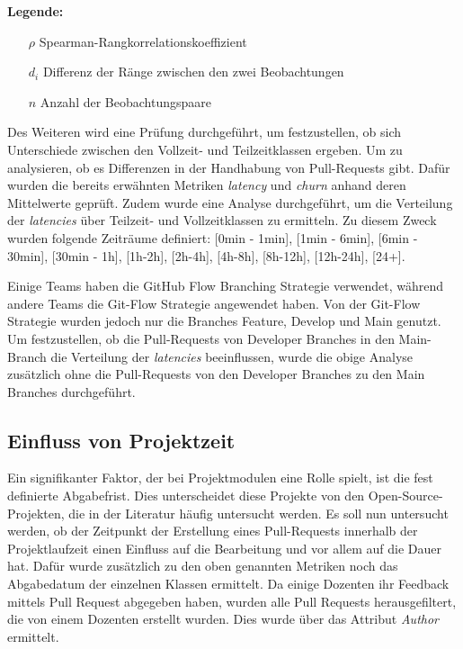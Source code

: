 \noindent\textbf{Legende:}
\begin{itemize}
  \item[$\rho$] Spearman-Rangkorrelationskoeffizient
  \item[$d_i$] Differenz der Ränge zwischen den zwei Beobachtungen 
  \item[$n$] Anzahl der Beobachtungspaare
\end{itemize}

Des Weiteren wird eine Prüfung durchgeführt, um festzustellen, ob sich Unterschiede zwischen den Vollzeit- und Teilzeitklassen ergeben. Um zu analysieren, ob es Differenzen in der Handhabung von Pull-Requests gibt. Dafür wurden die bereits erwähnten Metriken \textit{latency} und \textit{churn} anhand deren Mittelwerte geprüft. Zudem wurde eine Analyse durchgeführt, um die Verteilung der \textit{latencies} über Teilzeit- und Vollzeitklassen zu ermitteln. Zu diesem Zweck wurden folgende Zeiträume definiert: [0min - 1min], [1min - 6min], [6min - 30min], [30min - 1h], [1h-2h], [2h-4h], [4h-8h], [8h-12h], [12h-24h], [24+].

Einige Teams haben die GitHub Flow Branching Strategie verwendet, während andere Teams die Git-Flow Strategie angewendet haben. Von der Git-Flow Strategie wurden jedoch nur die Branches Feature, Develop und Main genutzt. Um festzustellen, ob die Pull-Requests von Developer Branches in den Main-Branch die Verteilung der \textit{latencies} beeinflussen, wurde die obige Analyse zusätzlich ohne die Pull-Requests von den Developer Branches zu den Main Branches durchgeführt.

\subsection{Einfluss von Projektzeit}
Ein signifikanter Faktor, der bei Projektmodulen eine Rolle spielt, ist die fest definierte Abgabefrist. Dies unterscheidet diese Projekte von den Open-Source-Projekten, die in der Literatur häufig untersucht werden. Es soll nun untersucht werden, ob der Zeitpunkt der Erstellung eines Pull-Requests innerhalb der Projektlaufzeit einen Einfluss auf die Bearbeitung und vor allem auf die Dauer hat. Dafür wurde zusätzlich zu den oben genannten Metriken noch das Abgabedatum der einzelnen Klassen ermittelt. Da einige Dozenten ihr Feedback mittels Pull Request abgegeben haben, wurden alle Pull Requests herausgefiltert, die von einem Dozenten erstellt wurden. Dies wurde über das Attribut \textit{Author} ermittelt.

